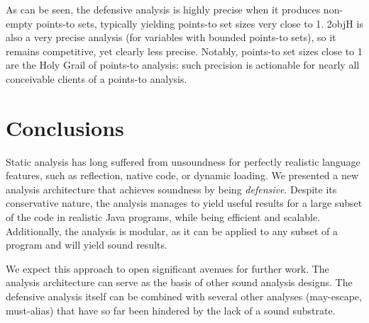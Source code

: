 As can be seen, the defensive analysis is highly precise when it produces non-empty points-to sets, typically yielding points-to set sizes very close to 1. 2objH is also a very precise analysis (for variables with bounded points-to sets), so it remains competitive, yet clearly less precise. Notably, points-to set sizes close to 1 are the Holy Grail of points-to analysis: such precision is actionable for nearly all conceivable clients of a points-to analysis.


\section{Conclusions}

Static analysis has long suffered from unsoundness for perfectly realistic language features, such as reflection, native code, or dynamic loading. We presented a new analysis architecture that achieves soundness by being \emph{defensive}. Despite its conservative nature, the analysis manages to yield useful results for a large subset of the code in realistic Java programs, while being efficient and scalable. Additionally, the analysis is modular, as it can be applied to any subset of a program and will yield sound results.

We expect this approach to open significant avenues for further work. The analysis architecture can serve as the basis of other sound analysis designs. The defensive analysis itself can be combined with several other analyses (may-escape, must-alias) that have so far been hindered by the lack of a sound substrate.